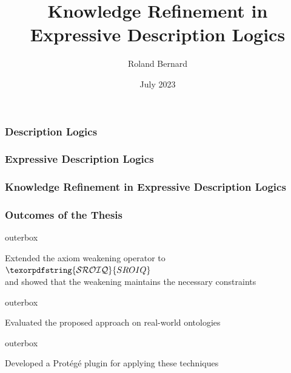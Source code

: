 \documentclass[aspectratio=169]{beamer}
\title{Knowledge Refinement in\\Expressive Description Logics}
\author{Roland Bernard}
\date{July 2023}
\newcommand{\SROIQ}{\ensuremath{\texorpdfstring{\mathcal{SROIQ}}{SROIQ}}\xspace}
\newlength{\offsetpage}
\newenvironment{narrowpage}[1][1cm]{
  \setlength{\offsetpage}{#1}
  \begin{adjustwidth}{\offsetpage}{\offsetpage}
  \addtolength{\textwidth}{-2\offsetpage}
}{\end{adjustwidth}}
\newenvironment{items}{\begin{narrowpage}\vfill}{\end{narrowpage}}
\newenvironment{oitem}[1][\scriptsize\raisebox{0.6mm}{\color{unibzblue} $\blacktriangleright$}]{\hfill\begin{beamercolorbox}[rounded=true,colsep=2mm]{outerbox}\parbox[t]{5mm}{#1}\begin{minipage}[t]{\textwidth}}{\end{minipage}\end{beamercolorbox}\hfill\vfill}
\begin{document}
\frame{\titlepage}

\begin{frame}
\frametitle{Description Logics}


\end{frame}

\begin{frame}
\frametitle{Expressive \textnormal{Description Logics}}


\end{frame}

\begin{frame}
\frametitle{Knowledge Refinement \textnormal{in Expressive Description Logics}}


\end{frame}

\begin{frame}
\frametitle{Outcomes of the Thesis}
\begin{items}
  \begin{oitem}
    Extended the axiom weakening operator to \SROIQ \\
    {\footnotesize and showed that the weakening maintains the necessary constraints}
  \end{oitem}
  \begin{oitem}
    Evaluated the proposed approach on real-world ontologies
  \end{oitem}
  \begin{oitem}
    Developed a Protégé plugin for applying these techniques
  \end{oitem}
\end{items}
\end{frame}

{
\begin{frame}[plain]{}
\end{frame}
}
\end{document}
